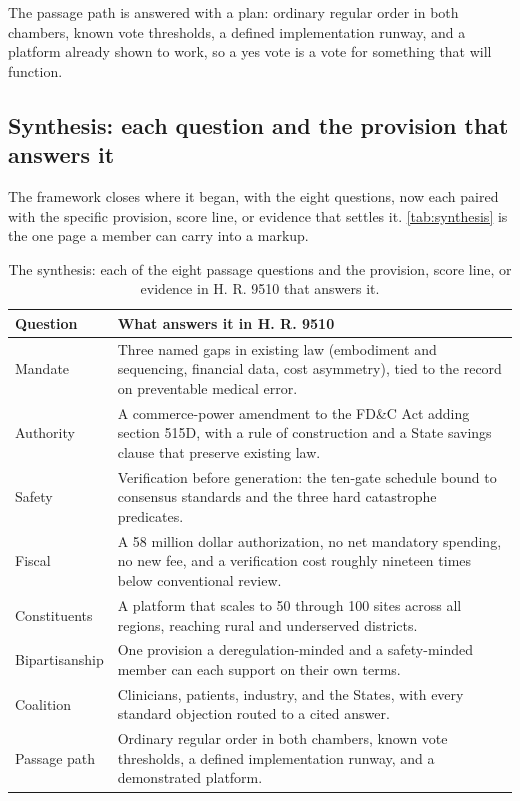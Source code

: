 The passage path is answered with a plan: ordinary regular order in both chambers,
known vote thresholds, a defined implementation runway, and a platform already shown
to work, so a yes vote is a vote for something that will function.

\subsection*{Synthesis: each question and the provision that answers it}

The framework closes where it began, with the eight questions, now each paired with
the specific provision, score line, or evidence that settles it.
\autoref{tab:synthesis} is the one page a member can carry into a markup.

\begin{table}[H]
\footnotesize
\begin{tabularx}{\textwidth}{@{}L{3.0cm} Y@{}}
\toprule
\textbf{Question} & \textbf{What answers it in H. R. 9510}\\
\midrule
Mandate & Three named gaps in existing law (embodiment and sequencing, financial data, cost asymmetry), tied to the record on preventable medical error.\\
Authority & A commerce-power amendment to the FD\&C Act adding section 515D, with a rule of construction and a State savings clause that preserve existing law.\\
Safety & Verification before generation: the ten-gate schedule bound to consensus standards and the three hard catastrophe predicates.\\
Fiscal & A 58 million dollar authorization, no net mandatory spending, no new fee, and a verification cost roughly nineteen times below conventional review.\\
Constituents & A platform that scales to 50 through 100 sites across all regions, reaching rural and underserved districts.\\
Bipartisanship & One provision a deregulation-minded and a safety-minded member can each support on their own terms.\\
Coalition & Clinicians, patients, industry, and the States, with every standard objection routed to a cited answer.\\
Passage path & Ordinary regular order in both chambers, known vote thresholds, a defined implementation runway, and a demonstrated platform.\\
\bottomrule
\end{tabularx}
\caption{The synthesis: each of the eight passage questions and the provision, score
line, or evidence in H. R. 9510 that answers it.}
\label{tab:synthesis}
\end{table}
